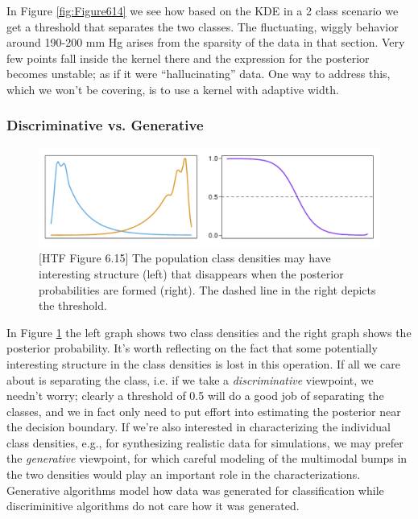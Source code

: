 \documentclass[a4paper]{article}
\begin{document}
In Figure \ref{fig:Figure614} we see how based on the KDE in a 2 class scenario we get a threshold that separates the two classes. The fluctuating, wiggly behavior around 190-200 mm Hg arises from the sparsity of the data in that section.  Very few points fall inside the kernel there and the expression for the posterior becomes unstable; as if it were ``hallucinating'' data.
One way to address this, which we won't be covering, is to use a kernel with adaptive width.




\subsubsection{Discriminative vs. Generative}

\begin{figure}
\centering
\includegraphics[width=1.0\textwidth]{Figure615.png}
\caption{\label{fig:Figure615}[HTF Figure 6.15] The population class densities may have interesting structure (left) that disappears when the posterior probabilities are formed (right). The dashed line in the right depicts the threshold.}
\end{figure}

In Figure \ref{fig:Figure615} the left graph shows two class densities
and the right graph shows the posterior probability.  It's worth reflecting on the fact that some potentially interesting structure in the class densities is lost in this operation.  If all we care about is separating the class, i.e. if we take a \emph{discriminative} viewpoint, we needn't worry; clearly a threshold of 0.5 will do a good job of separating the classes, and we in fact only need to put effort into estimating the posterior near the decision boundary.  If we're also interested in characterizing the individual class densities, e.g., for synthesizing realistic data for simulations, we may prefer the \emph{generative} viewpoint, for which careful modeling of the multimodal bumps in the two densities would play an important role in the characterizations. Generative algorithms model how data was generated for  classification while discriminitive algorithms do not care how it was generated.
\end{document}
